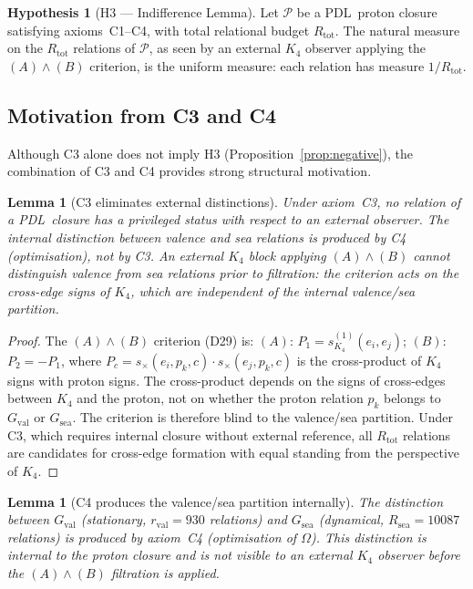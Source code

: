 \documentclass[11pt,a4paper]{article}
\newtheorem{lemma}[theorem]{Lemma}
\theoremstyle{definition}
\newtheorem{hypothesis}[theorem]{Hypothesis}
\newcommand{\PDL}{\textnormal{PDL}}
\newcommand{\Kfour}{K_4}
\newcommand{\rval}{r_{\mathrm{val}}}
\newcommand{\Rsea}{R_{\mathrm{sea}}}
\newcommand{\Rtot}{R_{\mathrm{tot}}}
\newcommand{\Gval}{G_{\mathrm{val}}}
\newcommand{\Gsea}{G_{\mathrm{sea}}}
\begin{document}
\begin{hypothesis}[H3 --- Indifference Lemma]
\label{hyp:H3}
Let $\mathcal{P}$ be a \PDL\ proton closure satisfying axioms~C1--C4,
with total relational budget $\Rtot$. The natural measure on the
$\Rtot$ relations of $\mathcal{P}$, as seen by an external
$\Kfour$ observer applying the $(A)\wedge(B)$ criterion, is the
uniform measure: each relation has measure $1/\Rtot$.
\end{hypothesis}

\subsection{Motivation from C3 and C4}

Although C3 alone does not imply H3 (Proposition~\ref{prop:negative}),
the combination of C3 and C4 provides strong structural motivation.

\begin{lemma}[C3 eliminates external distinctions]
\label{lem:C3}
Under axiom~C3, no relation of a \PDL\ closure has a privileged
status \emph{with respect to an external observer}. The internal
distinction between valence and sea relations is produced by C4
(optimisation), not by C3. An external $\Kfour$ block applying
$(A)\wedge(B)$ cannot distinguish valence from sea relations prior
to filtration: the criterion acts on the cross-edge signs of
$\Kfour$, which are independent of the internal valence/sea
partition.
\end{lemma}

\begin{proof}
The $(A)\wedge(B)$ criterion (D29) is:
$(A)$: $P_1 = s_{K_4}^{(1)}(e_i,e_j)$;
$(B)$: $P_2 = -P_1$,
where $P_c = s_\times(e_i,p_k,c)\cdot s_\times(e_j,p_k,c)$ is the
cross-product of $\Kfour$ signs with proton signs.
The cross-product depends on the signs of cross-edges between $\Kfour$
and the proton, not on whether the proton relation $p_k$ belongs to
$\Gval$ or $\Gsea$. The criterion is therefore blind to the
valence/sea partition. Under C3, which requires internal closure
without external reference, all $\Rtot$ relations are candidates
for cross-edge formation with equal standing from the perspective
of $\Kfour$.
\end{proof}

\begin{lemma}[C4 produces the valence/sea partition internally]
\label{lem:C4}
The distinction between $\Gval$ (stationary, $\rval = 930$ relations)
and $\Gsea$ (dynamical, $\Rsea = 10087$ relations) is produced by
axiom~C4 (optimisation of $\Omega$). This distinction is
\emph{internal} to the proton closure and is not visible to an
external $\Kfour$ observer before the $(A)\wedge(B)$ filtration is
applied.
\end{lemma}
\end{document}

